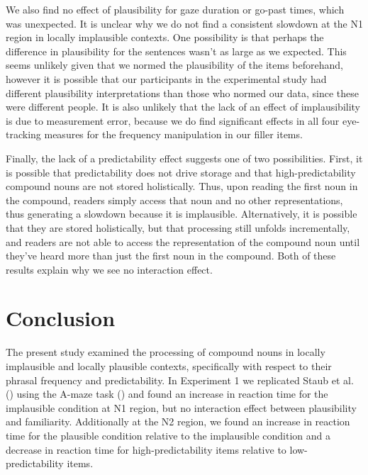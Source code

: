 \documentclass[
  12pt,
  letterpaper,
]{scrreport}
\begin{document}
We also find no effect of plausibility for gaze duration or go-past
times, which was unexpected. It is unclear why we do not find a
consistent slowdown at the N1 region in locally implausible contexts.
One possibility is that perhaps the difference in plausibility for the
sentences wasn't as large as we expected. This seems unlikely given that
we normed the plausibility of the items beforehand, however it is
possible that our participants in the experimental study had different
plausibility interpretations than those who normed our data, since these
were different people. It is also unlikely that the lack of an effect of
implausibility is due to measurement error, because we do find
significant effects in all four eye-tracking measures for the frequency
manipulation in our filler items.

Finally, the lack of a predictability effect suggests one of two
possibilities. First, it is possible that predictability does not drive
storage and that high-predictability compound nouns are not stored
holistically. Thus, upon reading the first noun in the compound, readers
simply access that noun and no other representations, thus generating a
slowdown because it is implausible. Alternatively, it is possible that
they are stored holistically, but that processing still unfolds
incrementally, and readers are not able to access the representation of
the compound noun until they've heard more than just the first noun in
the compound. Both of these results explain why we see no interaction
effect.

\section{Conclusion}\label{conclusion}

The present study examined the processing of compound nouns in locally
implausible and locally plausible contexts, specifically with respect to
their phrasal frequency and predictability. In Experiment 1 we
replicated Staub et al.
() using the A-maze
task () and
found an increase in reaction time for the implausible condition at N1
region, but no interaction effect between plausibility and familiarity.
Additionally at the N2 region, we found an increase in reaction time for
the plausible condition relative to the implausible condition and a
decrease in reaction time for high-predictability items relative to
low-predictability items.
\end{document}
